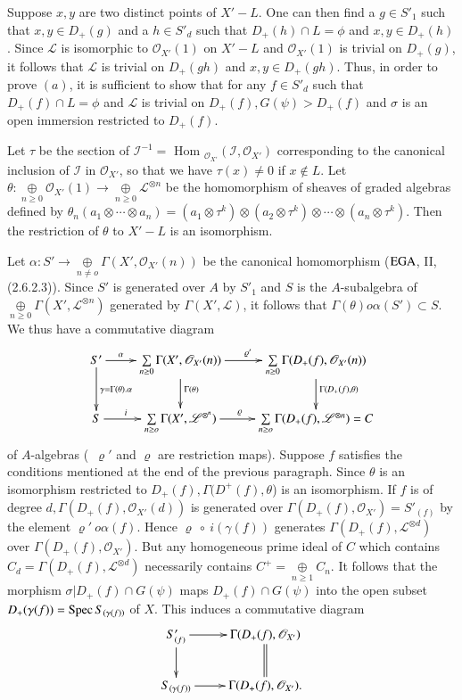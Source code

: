 Suppose $x,y$ are two distinct points of $X' - L$. One can then find a
$g \in S'_1$ such that $x, y \in D_+ (g)$ and a $h \in S'_d$ such that
$D_+(h)\cap L = \phi$ and $x,y \in
D_+(h)$. Since $\mathscr{L}$ is isomorphic to $\mathscr{O}_{X'}(1)$ on
$X' - L$ and $\mathscr{O}_{X'}(1)$ is trivial on $D_+(g)$, it follows
that $\mathscr{L}$ is trivial on $D_+ (gh)$ and $x,y \in
D_+(gh)$. Thus, in order to prove $(a)$, it is sufficient to show that
for any $f \in S'_d$ such that $D_+(f) \cap L = \phi$ and
$\mathscr{L}$ is trivial on $D_+(f),G(\psi) > D_+(f)$ and $\sigma$ is
an open immersion restricted to $D_+(f)$. 

Let $\tau$ be the section of $\mathscr{I}^{-1} = $ Hom
$_{\mathscr{O}_{X'}}(\mathscr{I},\mathscr{O}_{X'})$ corresponding to
the canonical inclusion of $\mathscr{I}$ in $\mathscr{O}_{X'}$, so
that we have $\tau(x) \neq 0 $ if $ x\notin L$. Let $\theta :
\underset{n\geq 0}{\oplus}\mathscr{O}_{X'}(1) \rightarrow \underset{n
  \geq 0}{\oplus}\mathscr{L}^{\otimes n}$ be the homomorphism of
sheaves of graded algebras defined by $\theta_n(a_1 \otimes \cdots
\otimes a_n) = (a_1 \otimes \tau^k)\otimes (a_2 \otimes \tau^{k})
\otimes \cdots \otimes(a_n \otimes \tau^{k})$. Then the restriction of
$\theta$ to $X' - L$ is an isomorphism. 

Let $\alpha : S' \rightarrow \underset{n\neq o}{\oplus}\Gamma
(X',\mathscr{O}_{X'}(n))$ be the canonical homomorphism
($\operatorname{EGA}$, II, (2.6.2.3)). Since $S'$ is generated over $A$ by $S'_1$ and
$S$ is the $A$-subalgebra of $\underset{n\geq 0}{\oplus}\Gamma
(X',\mathscr{L}^{\otimes n})$ generated by $\Gamma(X',\mathscr{L})$,
it follows that $\Gamma (\theta) o \alpha (S') \subset S$. We thus
have a commutative diagram\pageoriginale  
\[
\xymatrix{S'\ar[r]^>>>>>\alpha\ar[d]^{\gamma = \Gamma(\theta).\alpha} &
  \ar[d]^{\Gamma(\theta)} \sum\limits_{n \geq
    0}\Gamma(X',\mathscr{O}_{X'}(n))  
  \ar[r]^{\varrho'} &  \sum\limits_{n \geq 0}\Gamma
  (D_+(f),\mathscr{O}_{X'}(n)) \ar[d]^{\Gamma(D_+(f),\theta)}\\ 
  S \ar[r]^>>>>>i &  \sum\limits_{n\geq o} \Gamma
  (X',\mathscr{L}^{\otimes^n}) \ar[r]^>>>>>\varrho & \sum\limits_{n \geq
    o} \Gamma (D_+(f), \mathscr{L}^{\otimes n}) = C
}
\]
of $A$-algebras (\, $\varrho' $ and $\varrho $ are restriction
maps). Suppose $f$ satisfies the conditions mentioned at the end of
the previous paragraph. Since $\theta $ is an isomorphism restricted
to $D_+(f),\Gamma (D^+(f),\theta $) is an isomorphism. If $f$ is of
degree $d,\Gamma(D_+(f),\mathscr{O}_{X'}(d))$ is generated over
$\Gamma(D_+(f),\mathscr{O}_{X'}) = S'_{(f)}$ by the element $\varrho'~
o \alpha (f)$. Hence $\varrho ~\circ ~i(\gamma(f))$ generates
$\Gamma(D_+(f),\mathscr{L}^{\otimes d})$ over
$\Gamma(D_+(f),\mathscr{O}_{X'})$. But any homogeneous prime ideal of
$C$ which contains $C_d = \Gamma(D_+(f),\mathscr{L}^{\otimes d})$
necessarily contains $C^+ = \underset{n\geq 1}{\oplus} C_n$. It
follows that the morphism $\sigma|D_+(f) \cap G(\psi)$ maps
$D_+(f)\cap G(\psi)$ into the open subset $D_+(\gamma(f)) = \operatorname{Spec}
S_{(\gamma(f))}$ of $X$. This induces a commutative diagram 
\[
\xymatrix{S'_{(f)} \ar[d] \ar[r] & \Gamma (D_+ (f),  \mathscr{O}_{X'})
  \ar@{=}[d]\\ 
S_{(\gamma (f))} \ar[r] & \Gamma (D_+ (f), \mathscr{O}_{X'}).
}
\]

